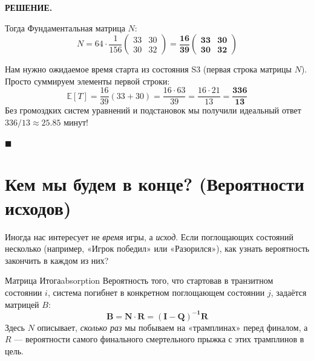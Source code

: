 \documentclass[12pt,a4paper]{article}
\newcommand{\E}{\mathbb{E}}
\newenvironment{solution}{
    \begin{tcolorbox}[
        enhanced, breakable, blanker,
        borderline west={2.5pt}{0pt}{solgray},
        left=12pt, top=5pt, bottom=5pt,
        before skip=10pt, after skip=15pt
    ]
    \textbf{\textsf{РЕШЕНИЕ.}}\;
}{
    \hfill $\blacksquare$
    \end{tcolorbox}
}
\begin{document}
\begin{solution}
Тогда Фундаментальная матрица $N$:
\[ N = 64 \cdot \frac{1}{156} \begin{pmatrix} 33 & 30 \\ 30 & 32 \end{pmatrix} = \mathbf{\frac{16}{39} \begin{pmatrix} 33 & 30 \\ 30 & 32 \end{pmatrix}} \]

Нам нужно ожидаемое время старта из состояния S3 (первая строка матрицы $N$). Просто суммируем элементы первой строки:
\[ \E[T] = \frac{16}{39} (33 + 30) = \frac{16 \cdot 63}{39} = \frac{16 \cdot 21}{13} = \mathbf{\frac{336}{13}} \]
Без громоздких систем уравнений и подстановок мы получили идеальный ответ $336/13 \approx 25.85$ минут!
\end{solution}

\newpage
\section{Кем мы будем в конце? (Вероятности исходов)}

Иногда нас интересует не \textit{время} игры, а \textit{исход}. Если поглощающих состояний несколько (например, «Игрок победил» или «Разорился»), как узнать вероятность закончить в каждом из них?

\begin{theorem}{Матрица Итога}{absorption}
Вероятность того, что стартовав в транзитном состоянии $i$, система погибнет в конкретном поглощающем состоянии $j$, задаётся матрицей $B$:
\[ \mathbf{B = N \cdot R = (I - Q)^{-1} R} \]
Здесь $N$ описывает, \textit{сколько раз} мы побываем на «трамплинах» перед финалом, а $R$ — вероятности самого финального смертельного прыжка с этих трамплинов в цель.
\end{theorem}
\end{document}
